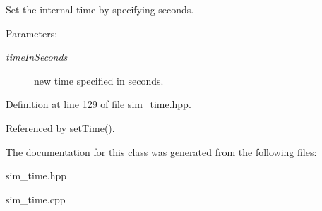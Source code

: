 Set the internal time by specifying seconds. 

\begin{Desc}
\item[Parameters:]
\begin{description}
\item[{\em time\-In\-Seconds}]new time specified in seconds. \end{description}
\end{Desc}


Definition at line 129 of file sim\_\-time.hpp.

Referenced by set\-Time().

The documentation for this class was generated from the following files:\begin{CompactItemize}
\item 
sim\_\-time.hpp\item 
sim\_\-time.cpp\end{CompactItemize}
